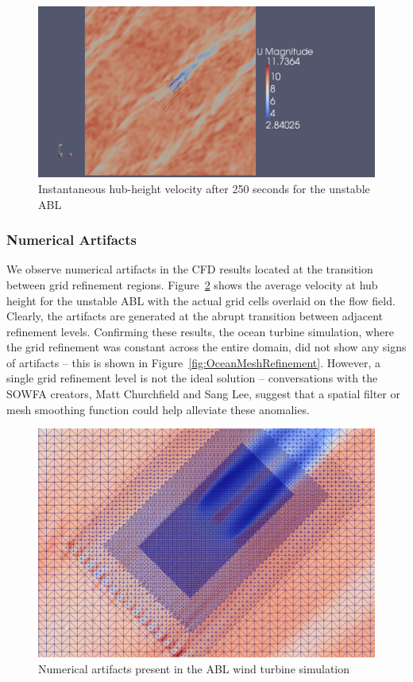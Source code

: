 \begin{figure}
\centering
\includegraphics[width=\textwidth]{images/unstableWindPlantVelPlan}
\caption{Instantaneous hub-height velocity after 250 seconds for the unstable ABL}
\label{fig:unstableWindPlantVelPlan}
\end{figure}

\subsubsection{Numerical Artifacts}
We observe numerical artifacts in the CFD results located at the transition between grid refinement regions.  Figure~\ref{fig:neutralWindPlantAvgVelPlanMeshRefine} shows the average velocity at hub height for the unstable ABL with the actual grid cells overlaid on the flow field.  Clearly, the artifacts are generated at the abrupt transition between adjacent refinement levels.   Confirming these results, the ocean turbine simulation, where the grid refinement was constant across the entire domain, did not show any signs of artifacts -- this is shown in Figure~\ref{fig:OceanMeshRefinement}. However, a single grid refinement level is not the ideal solution -- conversations with the SOWFA creators, Matt Churchfield and Sang Lee, suggest that a spatial filter or mesh smoothing function could help alleviate these anomalies.

\begin{figure}
\centering
\includegraphics[width=\textwidth]{images/neutralWindPlantAvgVelPlanMeshRefine}
\caption{Numerical artifacts present in the ABL wind turbine simulation}
\label{fig:neutralWindPlantAvgVelPlanMeshRefine}
\end{figure}

